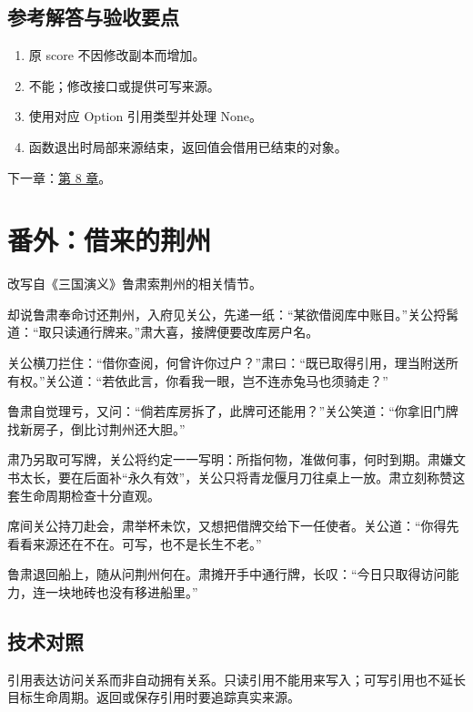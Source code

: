 \subsection*{参考解答与验收要点}

\begin{enumerate}

\item 原 score 不因修改副本而增加。

\item 不能；修改接口或提供可写来源。

\item 使用对应 Option 引用类型并处理 None。

\item 函数退出时局部来源结束，返回值会借用已结束的对象。

\end{enumerate}

下一章：\hyperref[ch:08]{第 8 章}。

\section{番外：借来的荆州}

改写自《三国演义》鲁肃索荆州的相关情节。

却说鲁肃奉命讨还荆州，入府见关公，先递一纸：“某欲借阅库中账目。”关公捋髯道：“取只读通行牌来。”肃大喜，接牌便要改库房户名。

关公横刀拦住：“借你查阅，何曾许你过户？”肃曰：“既已取得引用，理当附送所有权。”关公道：“若依此言，你看我一眼，岂不连赤兔马也须骑走？”

鲁肃自觉理亏，又问：“倘若库房拆了，此牌可还能用？”关公笑道：“你拿旧门牌找新房子，倒比讨荆州还大胆。”

肃乃另取可写牌，关公将约定一一写明：所指何物，准做何事，何时到期。肃嫌文书太长，要在后面补“永久有效”，关公只将青龙偃月刀往桌上一放。肃立刻称赞这套生命周期检查十分直观。

席间关公持刀赴会，肃举杯未饮，又想把借牌交给下一任使者。关公道：“你得先看看来源还在不在。可写，也不是长生不老。”

鲁肃退回船上，随从问荆州何在。肃摊开手中通行牌，长叹：“今日只取得访问能力，连一块地砖也没有移进船里。”

\subsection*{技术对照}

引用表达访问关系而非自动拥有关系。只读引用不能用来写入；可写引用也不延长目标生命周期。返回或保存引用时要追踪真实来源。
